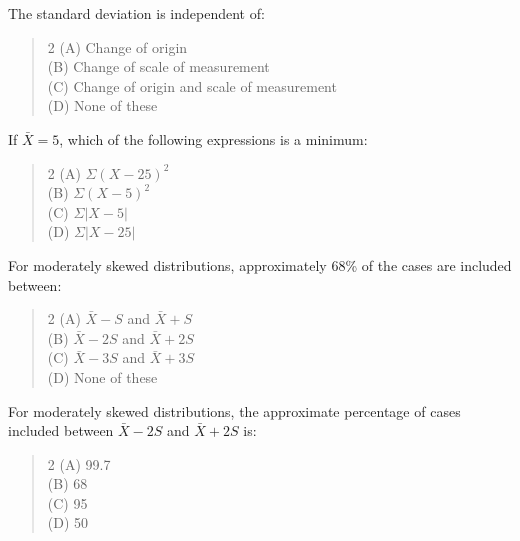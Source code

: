 \documentclass[11pt,a4paper]{article}
\begin{document}
\begin{mcqlist}
\item The standard deviation is independent of:
\begin{quote}\begin{multicols}{2}
\noindent (A) Change of origin \\
(B) Change of scale of measurement \\
(C) Change of origin and scale of measurement \\
(D) None of these
\end{multicols}\end{quote}

\item If $\bar{X}=5$, which of the following expressions is a minimum:
\begin{quote}\begin{multicols}{2}
\noindent (A) $\Sigma(X-25)^2$ \\
(B) $\Sigma(X-5)^2$ \\
(C) $\Sigma|X-5|$ \\
(D) $\Sigma|X-25|$
\end{multicols}\end{quote}

\item For moderately skewed distributions, approximately 68\% of the cases are included between:
\begin{quote}\begin{multicols}{2}
\noindent (A) $\bar{X}-S$ and $\bar{X}+S$ \\
(B) $\bar{X}-2S$ and $\bar{X}+2S$ \\
(C) $\bar{X}-3S$ and $\bar{X}+3S$ \\
(D) None of these
\end{multicols}\end{quote}

\item For moderately skewed distributions, the approximate percentage of cases included between $\bar{X}-2S$ and $\bar{X}+2S$ is:
\begin{quote}\begin{multicols}{2}
\noindent (A) 99.7\\%
(B) 68\\%
(C) 95\\%
(D) 50\\%
\end{multicols}\end{quote}


\end{mcqlist}
\end{document}
